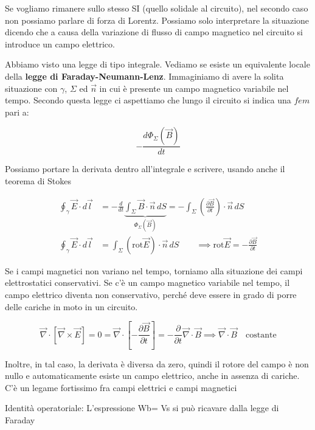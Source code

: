 Se vogliamo rimanere sullo stesso SI (quello solidale al circuito), nel secondo caso non possiamo parlare di forza di Lorentz. Possiamo solo interpretare la situazione dicendo che a causa della variazione di flusso di campo magnetico nel circuito si introduce un campo elettrico.

Abbiamo visto una legge di tipo integrale. Vediamo se esiste un equivalente locale della \textbf{legge di Faraday-Neumann-Lenz}. Immaginiamo di avere la solita situazione con $\gamma$, $\Sigma$ ed $\vec{n}$ in cui è presente un campo magnetico variabile nel tempo. Secondo questa legge ci aspettiamo che lungo il circuito si indica una $fem$ pari a:

\[
	-\frac{d\Phi_{\Sigma}(\vec{B} )}{dt}
\]

Possiamo portare la derivata dentro all'integrale e scrivere, usando anche il teorema di Stokes

\begin{equation*}
	\begin{aligned}
		\oint_{\gamma} \vec{E} \cdot d\vec{l} &= - \frac{d}{dt} \underbrace{\int_{\Sigma}\vec{B} \cdot \vec{n}\,dS}_{\Phi_{\Sigma}(\vec{B} )} = - \int_{\Sigma}\left( \frac{\partial \vec{B}}{\partial t}  \right) \cdot \vec{n} \,dS \\
		\oint_{\gamma} \vec{E} \cdot d\vec{l} &= \int_{\Sigma}(\text{rot}\vec{E} ) \cdot \vec{n} \,dS \qquad \implies \boxed{\text{rot}\vec{E} = - \frac{\partial \vec{B}}{\partial t}}
	\end{aligned}
\end{equation*}

Se i campi magnetici non variano nel tempo, torniamo alla situazione dei campi elettrostatici conservativi. Se c'è un campo magnetico variabile nel tempo, il campo elettrico diventa non conservativo, perché deve essere in grado di porre delle cariche in moto in un circuito.

\[
	\vec{\nabla} \cdot [\vec{\nabla} \times \vec{E} ] = 0 = \vec{\nabla} \cdot \left[ -\frac{\partial \vec{B}}{\partial t}  \right] = -\frac{\partial}{\partial t} \vec{\nabla} \cdot \vec{B}  \implies  \vec{\nabla} \cdot \vec{B} \quad \text{costante}
\]

Inoltre, in tal caso, la derivata è diversa da zero, quindi il rotore del campo è non nullo e automaticamente esiste un campo elettrico, anche in assenza di cariche. C'è un legame fortissimo fra campi elettrici e campi magnetici

Identità operatoriale: L'espressione Wb= Vs si può ricavare dalla legge di Faraday

